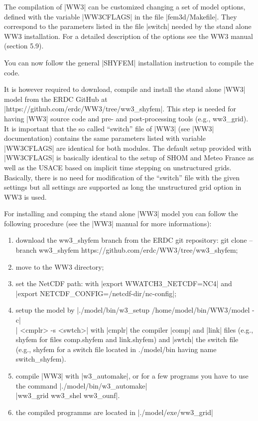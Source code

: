 The compilation of |WW3| can be customized changing a set of model options,
defined with the variable |WW3CFLAGS| in the file |fem3d/Makefile|. They
correspond to the parameters listed in the file |switch| needed by the stand 
alone WW3 installation. For a detailed description of the options see the WW3 
manual (section 5.9).

You can now follow the general |SHYFEM| installation instruction to compile the 
code.

It is however required to download, compile and install the stand alone |WW3| 
model from the ERDC GitHub at |https://github.com/erdc/WW3/tree/ww3_shyfem|. 
This step is needed for having |WW3| source code and pre- and post-processing 
tools (e.g., ww3\_grid). 
It is important that the so called ``switch'' file of |WW3| (see |WW3| documentation) 
contains the same parameters listed with variable |WW3CFLAGS| are identical 
for both modules. The default setup provided with |WW3CFLAGS| is basically 
identical to the setup of SHOM and Meteo France as well as the USACE based 
on implicit time stepping on unstructured grids. Basically, there is no need 
for modification of the ``switch'' file with the given settings but all 
settings are supported as long the unstructured grid option in WW3 is used.

For installing and comping the stand alone |WW3| model you can follow
the following procedure (see the |WW3| manual for more informations):
\begin{enumerate}
\item download the ww3\_shyfem branch from the ERDC git repository: 
git clone --branch ww3\_shyfem https://github.com/erdc/WW3/tree/ww3\_shyfem;
\item move to the WW3 directory;
\item set the NetCDF path: with |export WWATCH3_NETCDF=NC4| and \\
|export NETCDF_CONFIG=/netcdf-dir/nc-config|;
\item setup the model by |./model/bin/w3_setup /home/model/bin/WW3/model -c| \\
| <cmplr> -s <swtch>| with |cmplr| the compiler |comp| and |link| files (e.g., shyfem
for files comp.shyfem and link.shyfem) and |swtch| the switch file (e.g., shyfem 
for a switch file located in ./model/bin having name switch\_shyfem).
\item compile |WW3| with |w3_automake|, or for a few programs you have to use
the command |./model/bin/w3_automake| \\ |ww3_grid ww3_shel ww3_ounf|.
\item the compiled programms are located in |./model/exe/ww3_grid|
\end{enumerate}

